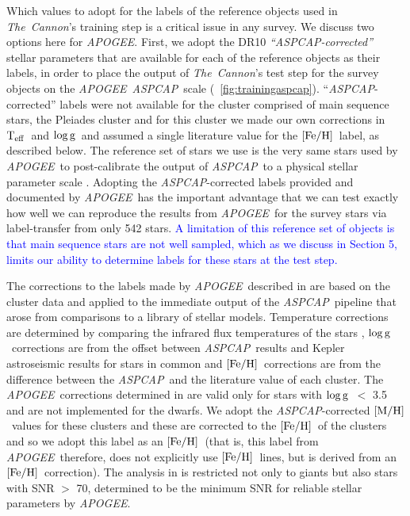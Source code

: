 \documentclass[12pt, preprint]{aastex}
\newcommand{\tc}{\textsl{The~Cannon}}
\newcommand{\apogee}{\textsl{APOGEE}}
\newcommand{\aspcap}{\textsl{ASPCAP}}
\newcommand{\teff}{\mbox{$\rm T_{eff}$}}
\newcommand{\feh}{\mbox{$\rm [Fe/H]$}}
\newcommand{\mh}{\mbox{$\rm [M/H]$}}
\newcommand{\logg}{\mbox{$\rm \log g$}}
\begin{document}
Which values to adopt for the labels of the reference objects used in \tc 's training step is a critical issue
in any survey. We discuss two options here for \apogee . 
First, we adopt the DR10 \textit{``\aspcap-corrected''} stellar parameters \citep{Meszaros2013} that are available for each of the reference objects as their labels, in order to place the output of \tc 's test step for the survey objects on the \apogee\ \aspcap\ scale (\figurename~\ref{fig:trainingaspcap}). ``\aspcap-corrected'' labels were not available for the cluster comprised of main sequence stars, the Pleiades cluster and for this cluster we made our own corrections in \teff\ and \logg\ and assumed a single literature value for the \feh\ label, as described below. 
The reference set of stars we use is the very same stars used by \apogee\ to post-calibrate the output of \aspcap\ to a physical stellar parameter scale \citep{Meszaros2013}.
Adopting the \aspcap-corrected labels provided and documented by \apogee\ has the important advantage 
that we can test exactly how well we can reproduce the results from \apogee\ for the survey stars via label-transfer from only 542 stars. \textcolor{blue}{A limitation of this reference set of objects is that main sequence stars are not well sampled, which as we discuss in Section 5, limits our ability to determine labels for these stars at the test step. }

The corrections to the labels made by \apogee\ described in \citet{Meszaros2013} are based on the cluster data and applied to the immediate output of the \aspcap\ pipeline that arose from comparisons to a library of stellar models.
Temperature corrections are determined by comparing the infrared flux temperatures of the stars \citep{gonzalez2009}, \logg\ corrections are from the offset between \aspcap\ results and Kepler astroseismic results for stars in common and \feh\ corrections are from the difference between the \aspcap\ and  the literature value of each cluster.  
The \apogee\ corrections determined in \citet{Meszaros2013} are valid only for stars with \logg\ $<$ 3.5 and are not implemented for the dwarfs.  We adopt the \aspcap-corrected \mh\ values for these clusters and these are corrected to the \feh\ of the clusters and so we adopt this label as an \feh\ (that is, this label from \apogee\ therefore, does not explicitly use \feh\ lines, but is derived from an \feh\ correction). 
The analysis in \citet{Meszaros2013} is restricted not only to giants but also stars with SNR $>$ 70, determined to be the minimum SNR for reliable stellar parameters by \apogee.
\end{document}
